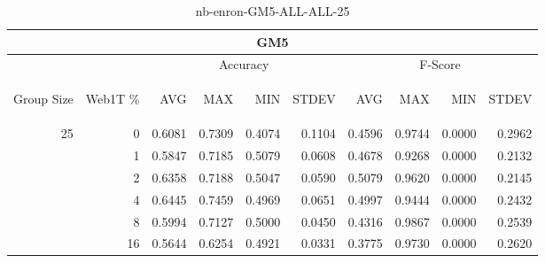 \begin{center}
\begin{table}[htbp] 
 \begin{center}
\begin{tabular}{ | r | r | r | r | r | r | r | r | r | r |}
\hline
\multicolumn{10}{|c|}{GM5}\\
\hline
 & & \multicolumn{4}{|c|}{Accuracy} & \multicolumn{4}{|c|}{F-Score}\\ \cline{3-10}
\begin{sideways}Group Size\end{sideways} & \begin{sideways}Web1T \%\end{sideways} & \begin{sideways}AVG\end{sideways} & \begin{sideways}MAX\end{sideways} & \begin{sideways}MIN\end{sideways} & \begin{sideways}STDEV\end{sideways} & \begin{sideways}AVG\end{sideways} & \begin{sideways}MAX\end{sideways} & \begin{sideways}MIN\end{sideways} & \begin{sideways}STDEV\end{sideways}\\
\hline
\multirow{5}{*}{25}
 & 0 & 0.6081 & 0.7309 & 0.4074 & 0.1104 & 0.4596 & 0.9744 & 0.0000 & 0.2962\\ \cline{2-10}
 & 1 & 0.5847 & 0.7185 & 0.5079 & 0.0608 & 0.4678 & 0.9268 & 0.0000 & 0.2132\\ \cline{2-10}
 & 2 & 0.6358 & 0.7188 & 0.5047 & 0.0590 & 0.5079 & 0.9620 & 0.0000 & 0.2145\\ \cline{2-10}
 & 4 & 0.6445 & 0.7459 & 0.4969 & 0.0651 & 0.4997 & 0.9444 & 0.0000 & 0.2432\\ \cline{2-10}
 & 8 & 0.5994 & 0.7127 & 0.5000 & 0.0450 & 0.4316 & 0.9867 & 0.0000 & 0.2539\\ \cline{2-10}
 & 16 & 0.5644 & 0.6254 & 0.4921 & 0.0331 & 0.3775 & 0.9730 & 0.0000 & 0.2620\\ \cline{2-10}
\hline
\end{tabular}
\caption{nb-enron-GM5-ALL-ALL-25}
\label{table:nb-enron-GM5-ALL-ALL-25}
\end{center}
 \end{table}
\end{center}

